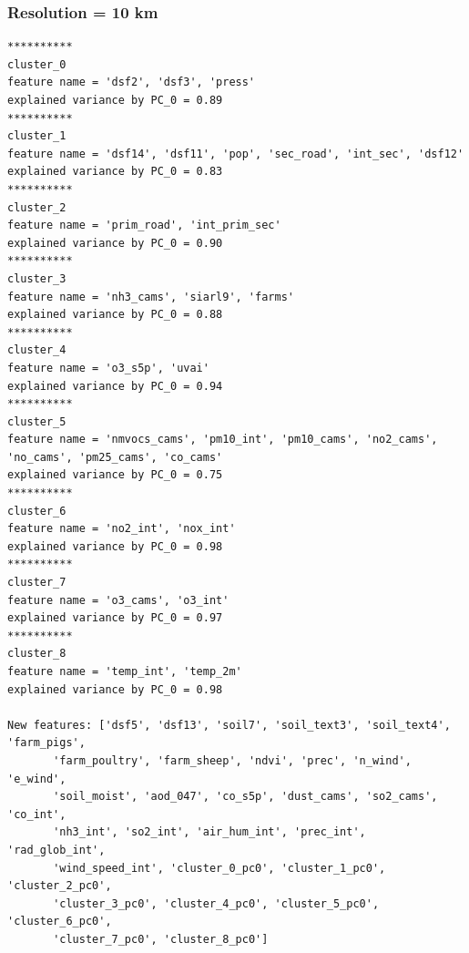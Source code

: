 \subsubsection{Resolution = 10 km}
\begin{verbatim}
**********
cluster_0
feature name = 'dsf2', 'dsf3', 'press'
explained variance by PC_0 = 0.89
**********
cluster_1
feature name = 'dsf14', 'dsf11', 'pop', 'sec_road', 'int_sec', 'dsf12'
explained variance by PC_0 = 0.83
**********
cluster_2
feature name = 'prim_road', 'int_prim_sec'
explained variance by PC_0 = 0.90
**********
cluster_3
feature name = 'nh3_cams', 'siarl9', 'farms'
explained variance by PC_0 = 0.88
**********
cluster_4
feature name = 'o3_s5p', 'uvai'
explained variance by PC_0 = 0.94
**********
cluster_5
feature name = 'nmvocs_cams', 'pm10_int', 'pm10_cams', 'no2_cams', 'no_cams', 'pm25_cams', 'co_cams'
explained variance by PC_0 = 0.75
**********
cluster_6
feature name = 'no2_int', 'nox_int'
explained variance by PC_0 = 0.98
**********
cluster_7
feature name = 'o3_cams', 'o3_int'
explained variance by PC_0 = 0.97
**********
cluster_8
feature name = 'temp_int', 'temp_2m'
explained variance by PC_0 = 0.98

New features: ['dsf5', 'dsf13', 'soil7', 'soil_text3', 'soil_text4', 'farm_pigs',
       'farm_poultry', 'farm_sheep', 'ndvi', 'prec', 'n_wind', 'e_wind',
       'soil_moist', 'aod_047', 'co_s5p', 'dust_cams', 'so2_cams', 'co_int',
       'nh3_int', 'so2_int', 'air_hum_int', 'prec_int', 'rad_glob_int',
       'wind_speed_int', 'cluster_0_pc0', 'cluster_1_pc0', 'cluster_2_pc0',
       'cluster_3_pc0', 'cluster_4_pc0', 'cluster_5_pc0', 'cluster_6_pc0',
       'cluster_7_pc0', 'cluster_8_pc0']
\end{verbatim}
\pagebreak
